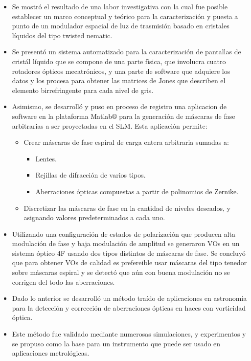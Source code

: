 \begin{itemize}
\item Se mostró el resultado de una labor investigativa con la cual
  fue posible establecer un marco conceptual y teórico para la
  caracterización y puesta a punto de un modulador espacial de luz de
  trasmisión basado en cristales líquidos del tipo twisted nematic. 
\item Se presentó un sistema automatizado para la caracterización de
  pantallas de cristál líquido que se compone de una parte física, que
  involucra cuatro rotadores ópticos mecatrónicos, y una parte de
  software que adquiere los datos y los procesa para obtener las
  matrices de Jones que describen el elemento birrefringente para cada
  nivel de gris. 
\item Asimismo, se desarrolló y puso en proceso de registro una aplicacion de software en la
  plataforma Matlab$\circledR$ para la
  generación de máscaras de fase arbitrarias a ser proyectadas en el
  SLM. Esta aplicación permite:
  \begin{itemize}
    \item Crear máscaras de fase espiral de carga entera arbitraria
      sumadas a:
      \begin{itemize}
        \item Lentes.
        \item Rejillas de difracción de varios tipos.
        \item Aberraciones ópticas compuestas a partir de polinomios
          de Zernike.
      \end{itemize}
    \item Discretizar las máscaras de fase en la cantidad de niveles
      deseados, y asignando valores predeterminados a cada uno. 
  \end{itemize}
 \item Utilizando una configuración de estados de polarización que
   producen alta modulación de fase y baja modulación de amplitud se
   generaron VOs en un sistema óptico 4F usando dos tipos distintos de
   máscaras de fase. Se concluyó que para obtener VOs de calidad es
   prefereible usar máscaras del tipo tenedor sobre máscaras espiral y
   se detectó que aún con buena modulación no se corrigen del todo las aberraciones. 
\item Dado lo anterior se desarrolló un método traído de aplicaciones
  en astronomía para la detección y corrección de aberraciones ópticas en haces con vorticidad óptica.
\item Este método fue validado mediante numerosas simulaciones, y
  experimentos y se propuso como la base para un instrumento que puede
  ser usado en aplicaciones metrológicas. 
\end{itemize}
